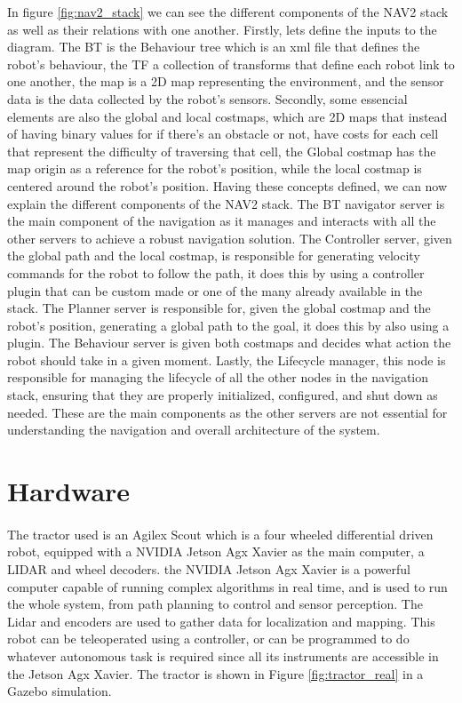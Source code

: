 In figure \ref{fig:nav2_stack} we can see the different components of the \gls{NAV2} stack as well as their 
relations with one another. Firstly, lets define the inputs to the diagram. The BT is the Behaviour tree 
which is an xml file that defines the robot's behaviour, the TF a collection of transforms that define each 
robot link to one another, the map is a 2D map representing the environment, and the sensor data is 
the data collected by the robot's sensors. Secondly, some essencial elements are also the global and local 
costmaps, which are 2D maps that instead of having binary values for if there's an obstacle or not, have 
costs for each cell that represent the difficulty of traversing that cell, the Global costmap 
has the map origin as a reference for the robot's position, while the local costmap is centered around 
the robot's position. Having these concepts defined, we can now explain the different components of 
the \gls{NAV2} stack. The BT navigator server is the main component of the navigation as it manages 
and interacts with all the other servers to achieve a robust navigation solution. The Controller server, 
given the global path and the local costmap, is responsible for generating velocity commands 
for the robot to follow the path, it does this by using a controller plugin that can be custom made or 
one of the many already available in the stack. The Planner server is responsible for, given the 
global costmap and the robot's position, generating a global path to the goal, it does this by also 
using a plugin. The Behaviour server is given both costmaps and decides what action the robot should take 
in a given moment. Lastly, the Lifecycle manager, this node is responsible for managing the lifecycle of all 
the other nodes in the navigation stack, ensuring that they are properly initialized, configured, and shut 
down as needed. These are the main components as the other servers are not essential for understanding 
the navigation and overall architecture of the system.

\section{Hardware}
\label{sec:hardware}

\paragraph{}The tractor used is an Agilex Scout which is a four wheeled differential driven robot, 
equipped with a NVIDIA Jetson Agx Xavier as the main computer, a LIDAR and wheel decoders. 
the NVIDIA Jetson Agx Xavier is a powerful computer capable of running complex algorithms in real time, 
and is used to run the whole system, from path planning to control and sensor 
perception. The Lidar and encoders are used to gather data for localization and mapping. This 
robot can be teleoperated using a controller, or can be programmed 
to do whatever autonomous task is required since all its instruments 
are accessible in the Jetson Agx Xavier. The tractor is shown in Figure \ref{fig:tractor_real} in a Gazebo simulation.

